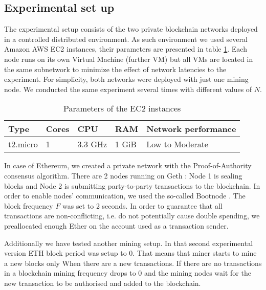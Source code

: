 \subsection{Experimental set up}

The experimental setup consists of the two private blockchain networks deployed in a controlled distributed environment. As such environment we used several Amazon AWS EC2 instances, their parameters are presented in table \ref{instance_params}. Each node runs on its own Virtual Machine (further VM) but all VMs are located in the same subnetwork to minimize the effect of network latencies to the experiment. For simplicity, both networks were deployed with just one mining node. We conducted the same experiment several times with different values of $N$.

\begin{table}[ht]
    \centering
    \begin{tabular}{|l|l|l|l|l|}
        \hline
        Type & Cores & CPU & RAM & Network performance \\
        \hline
        t2.micro & 1 & 3.3 GHz & 1 GiB & Low to Moderate \\
        \hline
    \end{tabular}
    \caption{Parameters of the EC2 instances \cite{ec2_params}}
    \label{instance_params}
\end{table}

In case of Ethereum, we created a private network with the Proof-of-Authority consensus algorithm. There are 2 nodes running on Geth \cite{geth}: Node 1 is sealing blocks and Node 2 is submitting party-to-party transactions to the blockchain. In order to enable nodes’ communication, we used the so-called Bootnode \cite{bootnode}. The block frequency $F$ was set to 2 seconds. In order to guarantee that all transactions are non-conflicting, i.e. do not potentially cause double spending, we preallocated enough Ether on the account used as a transaction sender.

Additionally we have tested another mining setup. In that second experimental version ETH block period was setup to 0. That means that miner starts to mine a new blocks only When there are a new transactions. If there are no transactions in a blockchain mining frequency drops to 0 and the mining nodes wait for the new transaction to be authorised and added to the blockchain. 
